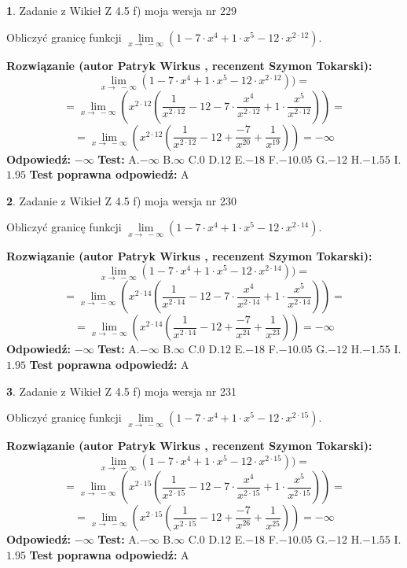 \documentclass[12pt, a4paper]{article}
\theoremstyle{definition} %
\newtheorem{zad}{}
\newcommand{\zadStart}[1]{\begin{zad}#1\newline}
\newcommand{\zadStop}{\end{zad}}
\newcommand{\rozwStart}[2]{\noindent \textbf{Rozwiązanie (autor #1 , recenzent #2): }\newline}
\newcommand{\rozwStop}{\newline}
\newcommand{\odpStart}{\noindent \textbf{Odpowiedź:}\newline}
\newcommand{\odpStop}{\newline}
\newcommand{\testStart}{\noindent \textbf{Test:}\newline}
\newcommand{\testStop}{\newline}
\newcommand{\kluczStart}{\noindent \textbf{Test poprawna odpowiedź:}\newline}
\newcommand{\kluczStop}{\newline}
\begin{document}
\zadStart{Zadanie z Wikieł Z 4.5 f) moja wersja nr 229}


Obliczyć granicę funkcji  $\lim\limits_{x\to\ -\infty}(1 - 7 \cdot x^{4}+1 \cdot x^{5}- 12 \cdot x^{2\cdot12})$.
\zadStop
\rozwStart{Patryk Wirkus}{Szymon Tokarski}
$$\lim\limits_{x\to\ -\infty}(1 - 7 \cdot x^{4}+1 \cdot x^{5}- 12 \cdot x^{2\cdot12}))=$$
$$=\lim\limits_{x\to\ -\infty}(x^{2\cdot12}(\frac{1}{x^{2\cdot12}}-12 -7 \cdot \frac{x^{4}}{x^{2\cdot12}}+1 \cdot \frac{x^{5}}{x^{2\cdot12}}))=$$
$$=\lim\limits_{x\to\ -\infty}(x^{2\cdot12}(\frac{1}{x^{2\cdot12}}-12 + \frac{-7}{x^{20}}+ \frac{1}{x^{19}}))=-\infty$$
\rozwStop
\odpStart
$-\infty$
\odpStop
\testStart
A.$-\infty$ B.$\infty$ C.$0$ D.$12$ E.$-18$
F.$-10.05$ G.$-12$
H.$-1.55$
I.$1.95$
\testStop
\kluczStart
A
\kluczStop



\zadStart{Zadanie z Wikieł Z 4.5 f) moja wersja nr 230}


Obliczyć granicę funkcji  $\lim\limits_{x\to\ -\infty}(1 - 7 \cdot x^{4}+1 \cdot x^{5}- 12 \cdot x^{2\cdot14})$.
\zadStop
\rozwStart{Patryk Wirkus}{Szymon Tokarski}
$$\lim\limits_{x\to\ -\infty}(1 - 7 \cdot x^{4}+1 \cdot x^{5}- 12 \cdot x^{2\cdot14}))=$$
$$=\lim\limits_{x\to\ -\infty}(x^{2\cdot14}(\frac{1}{x^{2\cdot14}}-12 -7 \cdot \frac{x^{4}}{x^{2\cdot14}}+1 \cdot \frac{x^{5}}{x^{2\cdot14}}))=$$
$$=\lim\limits_{x\to\ -\infty}(x^{2\cdot14}(\frac{1}{x^{2\cdot14}}-12 + \frac{-7}{x^{24}}+ \frac{1}{x^{23}}))=-\infty$$
\rozwStop
\odpStart
$-\infty$
\odpStop
\testStart
A.$-\infty$ B.$\infty$ C.$0$ D.$12$ E.$-18$
F.$-10.05$ G.$-12$
H.$-1.55$
I.$1.95$
\testStop
\kluczStart
A
\kluczStop



\zadStart{Zadanie z Wikieł Z 4.5 f) moja wersja nr 231}


Obliczyć granicę funkcji  $\lim\limits_{x\to\ -\infty}(1 - 7 \cdot x^{4}+1 \cdot x^{5}- 12 \cdot x^{2\cdot15})$.
\zadStop
\rozwStart{Patryk Wirkus}{Szymon Tokarski}
$$\lim\limits_{x\to\ -\infty}(1 - 7 \cdot x^{4}+1 \cdot x^{5}- 12 \cdot x^{2\cdot15}))=$$
$$=\lim\limits_{x\to\ -\infty}(x^{2\cdot15}(\frac{1}{x^{2\cdot15}}-12 -7 \cdot \frac{x^{4}}{x^{2\cdot15}}+1 \cdot \frac{x^{5}}{x^{2\cdot15}}))=$$
$$=\lim\limits_{x\to\ -\infty}(x^{2\cdot15}(\frac{1}{x^{2\cdot15}}-12 + \frac{-7}{x^{26}}+ \frac{1}{x^{25}}))=-\infty$$
\rozwStop
\odpStart
$-\infty$
\odpStop
\testStart
A.$-\infty$ B.$\infty$ C.$0$ D.$12$ E.$-18$
F.$-10.05$ G.$-12$
H.$-1.55$
I.$1.95$
\testStop
\kluczStart
A
\kluczStop
\end{document}
